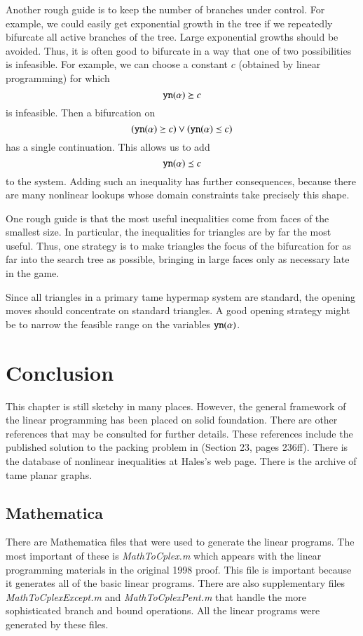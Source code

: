 Another rough guide is to keep the number of branches under
control.  For example, we could easily get exponential growth in
the tree if we repeatedly bifurcate all active branches of the
tree.  Large exponential growths should be avoided.  Thus, it is
often good to bifurcate in a way that one of two possibilities is
infeasible.  For example, we can choose a constant $c$ (obtained
by linear programming) for which
    $${\operatorname{{\texttt{yn}}}}(\alpha)\succeq c$$ is infeasible.  Then a bifurcation
    on
$$({\operatorname{{\texttt{yn}}}}(\alpha) \succeq c) \vee ({\operatorname{{\texttt{yn}}}}(\alpha) \preceq c)$$
has a single continuation.  This allows us to add
    $${\operatorname{{\texttt{yn}}}}(\alpha)\preceq c$$
to the system.  Adding such an inequality has further
consequences, because there are many nonlinear lookups whose
domain constraints take precisely this shape.

One rough guide is that the most useful inequalities come from
faces of the smallest size.  In particular, the inequalities for
triangles are by far the most useful.  Thus, one strategy is to
make triangles the focus of the bifurcation for as far into the
search tree as possible, bringing in large faces only as necessary
late in the game.

Since all triangles in a primary tame hypermap system are
standard, the opening moves should concentrate on standard
triangles.  A good opening strategy might be to narrow the
feasible range on the variables ${\operatorname{{\texttt{yn}}}}(\alpha)$.

\section{Conclusion}

This chapter is still sketchy in many places.  However, the
general framework of the linear programming has been placed on
solid foundation.  There are other references that may be
consulted for further details.  These references include the
published solution to the packing problem in \cite{DCG} (Section
23, pages 236ff). There is the database of nonlinear inequalities
at Hales's web page. There is the archive of tame planar graphs.

\subsection{Mathematica}

There are Mathematica files that were used to generate the linear
programs.  The most important of these is {\it MathToCplex.m}
which appears with the linear programming materials in the
original 1998 proof.  This file is important because it generates
all of the basic linear programs.  There are also supplementary
files {\it MathToCplexExcept.m} and {\it MathToCplexPent.m} that
handle the more sophisticated branch and bound operations.  All
the linear programs were generated by these files.

